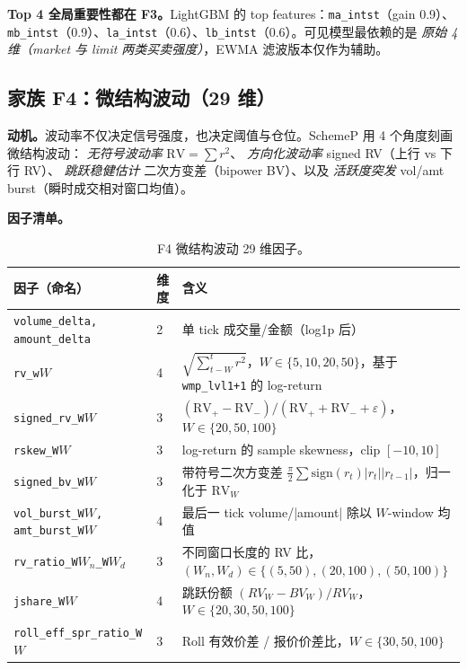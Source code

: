 \documentclass[10.5pt,a4paper]{article}
\begin{document}
\textbf{Top 4 全局重要性都在 F3。}LightGBM 的 top features：\texttt{ma\_intst}（gain 0.9）、\texttt{mb\_intst}（0.9）、\texttt{la\_intst}（0.6）、\texttt{lb\_intst}（0.6）。可见模型最依赖的是 \emph{原始 4 维（market 与 limit 两类买卖强度）}，EWMA 滤波版本仅作为辅助。

\subsection{家族 F4：微结构波动（29 维）}

\textbf{动机。}波动率不仅决定信号强度，也决定阈值与仓位。SchemeP 用 4 个角度刻画微结构波动：
\emph{无符号波动率} $\mathrm{RV}=\sum r^2$、
\emph{方向化波动率} signed RV（上行 vs 下行 RV）、
\emph{跳跃稳健估计} 二次方变差（bipower BV）、以及
\emph{活跃度突发} vol/amt burst（瞬时成交相对窗口均值）。

\textbf{因子清单。}
\begin{table}[H]
\centering\small
\begin{tabular}{p{} p{} p{}}
\toprule
因子（命名） & 维度 & 含义 \\
\midrule
\texttt{volume\_delta, amount\_delta} & 2 & 单 tick 成交量/金额（log1p 后） \\
\texttt{rv\_w$W$} & 4 & $\sqrt{\sum_{t-W}^{t} r^2}$，$W\!\in\!\{5,10,20,50\}$，基于 \texttt{wmp\_lvl1+1} 的 log-return \\
\texttt{signed\_rv\_W$W$} & 3 & $(\mathrm{RV}_+ - \mathrm{RV}_-)/(\mathrm{RV}_+ + \mathrm{RV}_- + \varepsilon)$，$W\!\in\!\{20,50,100\}$ \\
\texttt{rskew\_W$W$} & 3 & log-return 的 sample skewness，clip $[-10,10]$ \\
\texttt{signed\_bv\_W$W$} & 3 & 带符号二次方变差 $\frac{\pi}{2}\sum \mathrm{sign}(r_t)|r_t||r_{t-1}|$，归一化于 $\mathrm{RV}_W$ \\
\texttt{vol\_burst\_W$W$, amt\_burst\_W$W$} & 4 & 最后一 tick volume/|amount| 除以 $W$-window 均值 \\
\texttt{rv\_ratio\_W$W_n$\_W$W_d$} & 3 & 不同窗口长度的 RV 比，$(W_n,W_d)\!\in\!\{(5,50),(20,100),(50,100)\}$ \\
\texttt{jshare\_W$W$} & 4 & 跳跃份额 $(RV_W - BV_W)/RV_W$，$W\!\in\!\{20,30,50,100\}$ \\
\texttt{roll\_eff\_spr\_ratio\_W$W$} & 3 & Roll 有效价差 / 报价价差比，$W\!\in\!\{30,50,100\}$ \\
\bottomrule
\end{tabular}
\caption{F4 微结构波动 29 维因子。}
\end{table}
\end{document}
